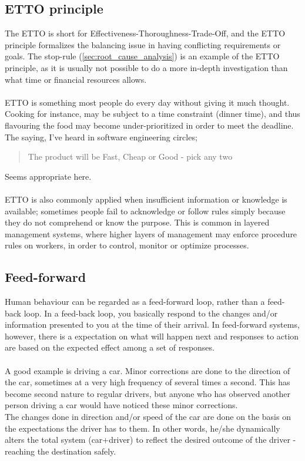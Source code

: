 \documentclass[10pt,oneside]{book}                  %
\begin{document}
\subsection{ETTO principle}
\label{sec:etto_principle	}
The ETTO is short for Effectiveness-Thoroughness-Trade-Off, and the ETTO principle formalizes the balancing issue in having conflicting requirements or goals. The stop-rule (\ref{sec:root_cause_analysis}) is an example of the ETTO principle, as it is usually not possible to do a more in-depth investigation than what time or financial resources allows.\\
\\
ETTO is something most people do every day without giving it much thought. Cooking for instance, may be subject to a time constraint (dinner time), and thus flavouring the food may become under-prioritized in order to meet the deadline. The saying, I've heard in software engineering circles;
 \begin{quote}
 The product will be Fast, Cheap or Good - pick any two
\end{quote}
Seems appropriate here.\\
\\
ETTO is also commonly applied when insufficient information or knowledge is available; sometimes people fail to acknowledge or follow rules simply because they do not comprehend or know the purpose. This is common in layered management systems, where higher layers of management may enforce procedure rules on workers, in order to control, monitor or optimize processes.

\subsection{Feed-forward}
\label{sec:feed_forward}
Human behaviour can be regarded as a feed-forward loop, rather than a feed-back loop. In a feed-back loop, you basically respond to the changes and/or information presented to you at the time of their arrival. In feed-forward systems, however, there is a expectation on what will happen next and responses to action are based on the expected effect among a set of responses.\\
\\
A good example is driving a car. Minor corrections are done to the direction of the car, sometimes at a very high frequency of several times a second. This has become second nature to regular drivers, but anyone who has observed another person driving a car would have noticed these minor corrections.\\
The changes done in direction and/or speed of the car are done on the basis on the expectations the driver has to them. In other words, he/she dynamically alters the total system (car+driver) to reflect the desired outcome of the driver - reaching the destination safely.
\end{document}
